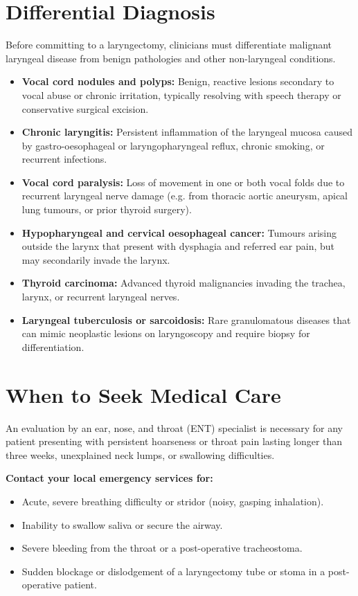 \section*{Differential Diagnosis}
Before committing to a laryngectomy, clinicians must differentiate malignant laryngeal disease from benign pathologies and other non-laryngeal conditions.
\begin{itemize}
    \item \textbf{Vocal cord nodules and polyps:} Benign, reactive lesions secondary to vocal abuse or chronic irritation, typically resolving with speech therapy or conservative surgical excision.
    \item \textbf{Chronic laryngitis:} Persistent inflammation of the laryngeal mucosa caused by gastro-oesophageal or laryngopharyngeal reflux, chronic smoking, or recurrent infections.
    \item \textbf{Vocal cord paralysis:} Loss of movement in one or both vocal folds due to recurrent laryngeal nerve damage (e.g. from thoracic aortic aneurysm, apical lung tumours, or prior thyroid surgery).
    \item \textbf{Hypopharyngeal and cervical oesophageal cancer:} Tumours arising outside the larynx that present with dysphagia and referred ear pain, but may secondarily invade the larynx.
    \item \textbf{Thyroid carcinoma:} Advanced thyroid malignancies invading the trachea, larynx, or recurrent laryngeal nerves.
    \item \textbf{Laryngeal tuberculosis or sarcoidosis:} Rare granulomatous diseases that can mimic neoplastic lesions on laryngoscopy and require biopsy for differentiation.
\end{itemize}

\section*{When to Seek Medical Care}
An evaluation by an ear, nose, and throat (ENT) specialist is necessary for any patient presenting with persistent hoarseness or throat pain lasting longer than three weeks, unexplained neck lumps, or swallowing difficulties.

\textbf{Contact your local emergency services for:}
\begin{itemize}
    \item Acute, severe breathing difficulty or stridor (noisy, gasping inhalation).
    \item Inability to swallow saliva or secure the airway.
    \item Severe bleeding from the throat or a post-operative tracheostoma.
    \item Sudden blockage or dislodgement of a laryngectomy tube or stoma in a post-operative patient.
\end{itemize}

